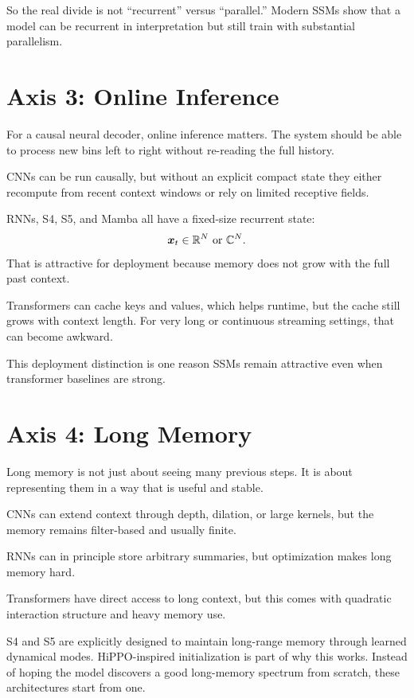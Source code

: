 So the real divide is not ``recurrent'' versus ``parallel.'' Modern SSMs show that a model
can be recurrent in interpretation but still train with substantial parallelism.

\section{Axis 3: Online Inference}

For a causal neural decoder, online inference matters. The system should be able to process
new bins left to right without re-reading the full history.

CNNs can be run causally, but without an explicit compact state they either recompute from
recent context windows or rely on limited receptive fields.

RNNs, S4, S5, and Mamba all have a fixed-size recurrent state:
\[
  \bm{x}_t \in \mathbb{R}^N \text{ or } \mathbb{C}^N.
\]
That is attractive for deployment because memory does not grow with the full past context.

Transformers can cache keys and values, which helps runtime, but the cache still grows with
context length. For very long or continuous streaming settings, that can become awkward.

This deployment distinction is one reason SSMs remain attractive even when transformer
baselines are strong.

\section{Axis 4: Long Memory}

Long memory is not just about seeing many previous steps. It is about representing them in
a way that is useful and stable.

CNNs can extend context through depth, dilation, or large kernels, but the memory remains
filter-based and usually finite.

RNNs can in principle store arbitrary summaries, but optimization makes long memory hard.

Transformers have direct access to long context, but this comes with quadratic interaction
structure and heavy memory use.

S4 and S5 are explicitly designed to maintain long-range memory through learned dynamical
modes. HiPPO-inspired initialization is part of why this works. Instead of hoping the model
discovers a good long-memory spectrum from scratch, these architectures start from one.

